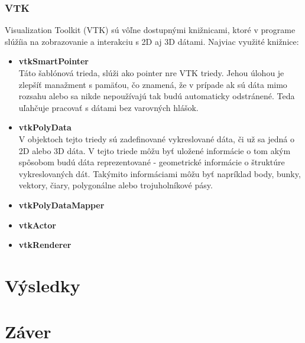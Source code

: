 \documentclass[a4paper,11pt,twoside]{article}%
\begin{document}
\subsubsection{VTK}

Visualization Toolkit (VTK) sú vôľne dostupnými knižnicami, ktoré v programe slúžíia na zobrazovanie a interakciu s 2D aj 3D dátami. Najviac využité knižnice:

\begin{itemize}
\item \textbf{vtkSmartPointer} \\
Táto šablónová trieda, slúži ako pointer nre VTK triedy. Jehou úlohou je zlepšíť manažment s pamäťou, čo znamená, že v prípade ak sú dáta mimo rozsahu alebo sa nikde nepoužívajú tak budú automaticky odstránené. Teda uľahčuje pracovať s dátami bez varovných hlášok.

\item \textbf{vtkPolyData} \\
V objektoch tejto triedy sú zadefinované vykreslované dáta, či už sa jedná o 2D alebo 3D dáta. V tejto triede môžu byť uložené informácie o tom akým spôsobom budú dáta reprezentované - geometrické informácie o štruktúre vykreslovaných dát. Takýmito informáciami môžu byť napríklad body, bunky, vektory, čiary, polygonálne alebo trojuholníkové pásy.

\item \textbf{vtkPolyDataMapper} \\
\item \textbf{vtkActor} \\
\item \textbf{vtkRenderer} \\
\end{itemize}






\section{Výsledky}

\section{Záver}

\begin{thebibliography}{50}
\end{thebibliography}
\end{document}
